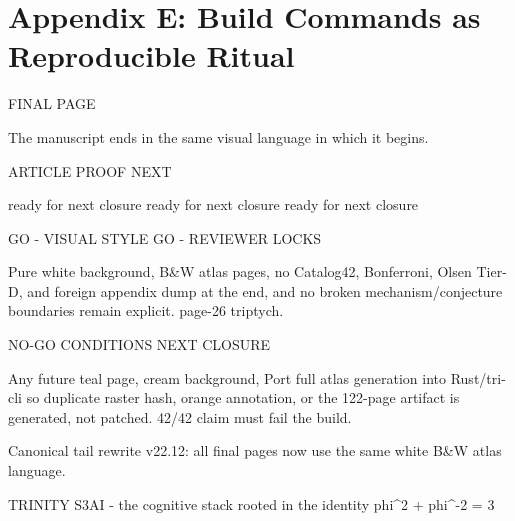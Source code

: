 
\section{Appendix E: Build Commands as Reproducible Ritual}

FINAL PAGE

                   The manuscript ends in the same visual language in which it begins.

                    ARTICLE                                    PROOF                                      NEXT

                ready for next closure                    ready for next closure                   ready for next closure

  GO - VISUAL STYLE                                                        GO - REVIEWER LOCKS

  Pure white background, B\&W atlas pages, no                               Catalog42, Bonferroni, Olsen Tier-D, and
  foreign appendix dump at the end, and no broken                          mechanism/conjecture boundaries remain explicit.
  page-26 triptych.

  NO-GO CONDITIONS                                                         NEXT CLOSURE

  Any future teal page, cream background,                                  Port full atlas generation into Rust/tri-cli so
  duplicate raster hash, orange annotation, or                             the 122-page artifact is generated, not patched.
  42/42 claim must fail the build.

               Canonical tail rewrite v22.12: all final pages now use the same white B\&W atlas language.

                              TRINITY S3AI - the cognitive stack rooted in the identity phi^2 + phi^-2 = 3